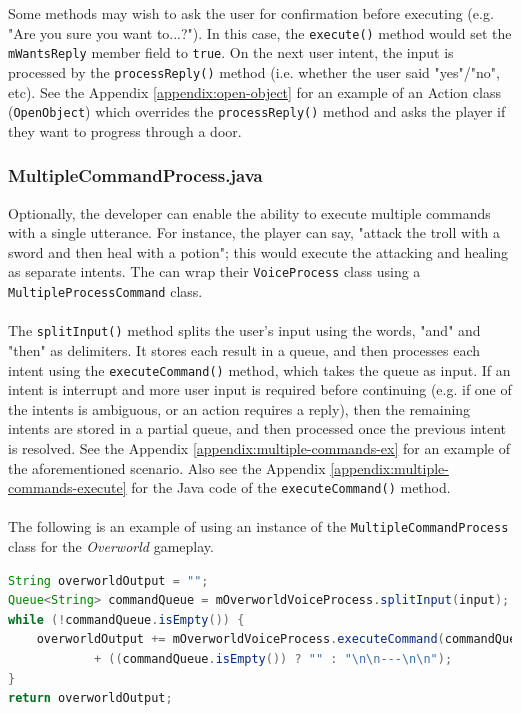 \documentclass[11pt]{article}
\begin{document}
Some methods may wish to ask the user for confirmation before executing (e.g. "Are you sure you want to...?"). In this case, the \texttt{execute()} method would set the \texttt{mWantsReply} member field to \texttt{true}. On the next user intent, the input is processed by the \texttt{processReply()} method (i.e. whether the user said "yes"/"no", etc). See the Appendix \ref{appendix:open-object} for an example of an Action class (\texttt{OpenObject}) which overrides the \texttt{processReply()} method and asks the player if they want to progress through a door.

\subsubsection{MultipleCommandProcess.java}

Optionally, the developer can enable the ability to execute multiple commands with a single utterance. For instance, the player can say, "attack the troll with a sword and then heal with a potion"; this would execute the attacking and healing as separate intents. The can wrap their \texttt{VoiceProcess} class using a \texttt{MultipleProcessCommand} class.
\\
\\
The \texttt{splitInput()} method splits the user's input using the words, "and" and "then" as delimiters. It stores each result in a queue, and then processes each intent using the \texttt{executeCommand()} method, which takes the queue as input. If an intent is interrupt and more user input is required before continuing (e.g. if one of the intents is ambiguous, or an action requires a reply), then the remaining intents are stored in a partial queue, and then processed once the previous intent is resolved. See the Appendix \ref{appendix:multiple-commands-ex} for an example of the aforementioned scenario. Also see the Appendix \ref{appendix:multiple-commands-execute} for the Java code of the \texttt{executeCommand()} method.
\\
\\
The following is an example of using an instance of the \texttt{MultipleCommandProcess} class for the \textit{Overworld} gameplay.

\begin{lstlisting}[language=Java]
String overworldOutput = "";
Queue<String> commandQueue = mOverworldVoiceProcess.splitInput(input);
while (!commandQueue.isEmpty()) {
    overworldOutput += mOverworldVoiceProcess.executeCommand(commandQueue)
            + ((commandQueue.isEmpty()) ? "" : "\n\n---\n\n");
}
return overworldOutput;
\end{lstlisting}
\end{document}
